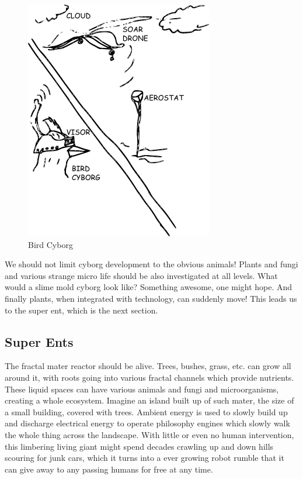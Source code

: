 \begin{figure}[htbp]
\centering
\includegraphics{images/birdcyborg.png}
\caption{Bird Cyborg}
\end{figure}

We should not limit cyborg development to the obvious animals! Plants
and fungi and various strange micro life should be also investigated at
all levels. What would a slime mold cyborg look like? Something awesome,
one might hope. And finally plants, when integrated with technology, can
suddenly move! This leads us to the super ent, which is the next
section.

\subsection{Super Ents}\label{super-ents}

The fractal mater reactor should be alive. Trees, bushes, grass, etc.
can grow all around it, with roots going into various fractal channels
which provide nutrients. These liquid spaces can have various animals
and fungi and microorganisms, creating a whole ecosystem. Imagine an
island built up of such mater, the size of a small building, covered
with trees. Ambient energy is used to slowly build up and discharge
electrical energy to operate philosophy engines which slowly walk the
whole thing across the landscape. With little or even no human
intervention, this limbering living giant might spend decades crawling
up and down hills scouring for junk cars, which it turns into a ever
growing robot rumble that it can give away to any passing humans for
free at any time.

